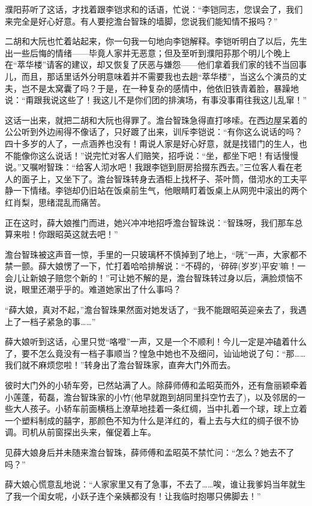 \par 濮阳荪听了这话，才找着跟李铠求和的话语，忙说：“李铠同志，您误会了，我们来完全是好心好意。有人要挖澹台智珠的墙脚，您说我们能知情不报吗？”
\par 二胡和大阮也忙着站起来，你一句我一句地向李铠解释。李铠听明白了以后，先生出一些后悔的情绪——毕竟人家并无恶意；但及至听到濮阳荪那个明儿个晚上在“萃华楼”请客的建议，却又恢复了厌恶与嫌怨——他们拿着我们家的钱不当回事儿，而且，那话里话外分明意味着并不需要我也去趟“萃华楼”，当这么个演员的丈夫，岂不是太窝囊了吗？于是，在一种复杂的感情中，他依旧铁青着脸，暴躁地说：“甭跟我说这些了！我这儿不是你们团的排演场，有事没事甭往我这儿乱窜！”
\par 这话一出来，就把二胡和大阮也得罪了。澹台智珠急得直打哆嗦。在西边屋呆着的公公听到外边闹得不像话了，只好踱了出来，训斥李铠说：“有你这么说话的吗？四十多岁的人了，一点涵养也没有！甭说人家是好心好意，就是找错门的生人，也不能像你这么说话！”说完忙对客人们赔笑，招呼说：“坐，都坐下吧！有话慢慢说。”又嘱咐智珠：“给客人沏水吧！我跟李铠到厨房拾掇东西去。”三位客人看在老人的面子上，又坐下了。澹台智珠转身去酒柜上找杯子、茶叶筒，借沏水的工夫平静一下情绪。李铠却仍旧站在饭桌前生气，他眼睛盯着饭桌上从网兜中滚出的两个红肖梨，思绪混乱而痛苦。
\par 正在这时，薛大娘推门而进，她兴冲冲地招呼澹台智珠说：“智珠呀，我们那车总算来啦！你跟昭英这就去吧！”
\par 澹台智珠被这声音一惊，手里的一只玻璃杯不慎掉到了地上，“咣”一声，大家都不禁一颤。薛大娘愣了一下，忙打着哈哈排解说：“不碍的，‘碎碎(岁岁)平安’嘛！一会儿让新娘子赔您个新的！”可让她不解的是，澹台智珠转过身以后，满脸烦恼不说，眼里还潮乎乎的。难道她家出了什么事吗？
\par “薛大娘，真对不起，”澹台智珠果然面对她发话了，“我不能跟昭英迎亲去了，我遇上了一档子紧急的事……”
\par 薛大娘听到这话，心里只觉“咯噔”一声，又是一个不顺利！今儿一定是冲磕着什么了，要不怎么竟没有一档子事顺当？惶急中她也不及细问，讪讪地说了句：“那……我们就不麻烦您啦！”转身出了澹台智珠家，直奔大门外而去。
\par 彼时大门外的小轿车旁，已然站满了人。除薛师傅和孟昭英而外，还有詹丽颖牵着小莲蓬，荀磊，澹台智珠家的小竹(他早就跑到胡同里抖空竹去了)，以及邻居的一些大人孩子。小轿车前面横档上潦草地挂着一条红绸，当中扎着一个球，球上立着一个塑料制成的囍字，那颜色不知为什么是洋红的，看上去与大红的绸子很不协调。司机从前窗探出头来，催促着上车。
\par 见薛大娘身后并未随来澹台智珠，薛师傅和孟昭英不禁忙问：“怎么？她去不了吗？”
\par 薛大娘心慌意乱地说：“人家家里又有了急事，不去了……唉，谁让我爹妈当年就生了我一个闺女呢，小跃子连个亲姨都没有！让我临时抱哪只佛脚去！”
